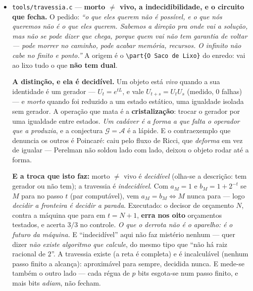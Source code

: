 \documentclass[11pt]{article}
\newcommand{\code}[1]{\texttt{\small #1}}
\theoremstyle{plain}
\theoremstyle{remark}
\begin{document}
\begin{itemize}
\textbf{E §E7 valida pelos dois caminhos}, que é a disciplina que este projeto aprendeu a ter: a
forma fechada (das raízes da borda) contra a integração no tempo, nas três classes, resíduo
$\sim10^{-9}$. O caso do meio é o que interessa --- no crítico a forma fechada \emph{precisa} do
termo $t\,e^{st}$, e a fórmula das duas raízes distintas dividiria por $s_1-s_2=0$. A simulação, que
não sabe de raízes, denunciaria. \emph{Um circuito que só fecha num dos caminhos não está resolvido:
está adivinhado.} Ligado à assistente (\code{conversa.c}), com os negativos medidos --- ``o que é um
circuito RLC'' vai ao corpus, não ao resolvedor.

\item \code{tools/travessia.c} --- \textbf{morto $\ne$ vivo, a indecidibilidade, e o circuito
que fecha.} O pedido: \emph{``o que eles querem não é possível, e o que nós queremos não é o que
eles querem. Sabemos a direção pra onde vai a solução, mas não se pode dizer que chega, porque quem
vai não tem garantia de voltar --- pode morrer no caminho, pode acabar memória, recursos. O
infinito não cabe no finito e ponto.''} A origem é o \verb|\part{O Saco de Lixo}| do enredo: vai ao
lixo tudo o que \textbf{não tem dual}.

\textbf{A distinção, e ela é decidível.} Um objeto está \emph{vivo} quando a sua identidade é um
gerador --- $U_t=e^{tL}$, e vale $U_{t+s}=U_tU_s$ (medido, $0$ falhas) --- e \emph{morto} quando foi
reduzido a um estado estático, uma igualdade isolada sem gerador. A operação que mata é a
\textbf{cristalização}: trocar o gerador por uma igualdade entre estados. \emph{Um cadáver é a forma
a que falta o operador que a produzia}, e a conjectura $\mathcal G=\mathcal A$ é a lápide. E o
contraexemplo que denuncia os outros é Poincaré: caiu pelo fluxo de Ricci, que \emph{deforma} em vez
de igualar --- Perelman não soldou lado com lado, deixou o objeto rodar até a forma.

\textbf{E a troca que isto faz:} morto $\ne$ vivo é \emph{decidível} (olha-se a descrição: tem
gerador ou não tem); a travessia é \emph{indecidível}. Com $a_M=1$ e $b_M=1+2^{-t}$ se $M$ para no
passo $t$ (par computável), vem $a_M=b_M\iff M$ nunca para --- logo \emph{decidir a fronteira é
decidir a parada}. Executado: o decisor de orçamento $N$, contra a máquina que para em $t=N+1$,
\textbf{erra nos oito} orçamentos testados, e acerta $3/3$ no controle. \emph{O que o derrota não é
o aparelho: é o futuro da máquina.} E ``indecidível'' aqui não faz mistério nenhum --- quer dizer
\emph{não existe algoritmo que calcule}, do mesmo tipo que ``não há raiz racional de $2$''. A
travessia existe (a reta é completa) e é incalculável (nenhum passo finito a alcança): aproximável
para sempre, decidida nunca. E mede-se também o outro lado --- cada régua de $p$ bits esgota-se num
passo finito, e mais bits \emph{adiam}, não fecham.


\end{itemize}
\end{document}
